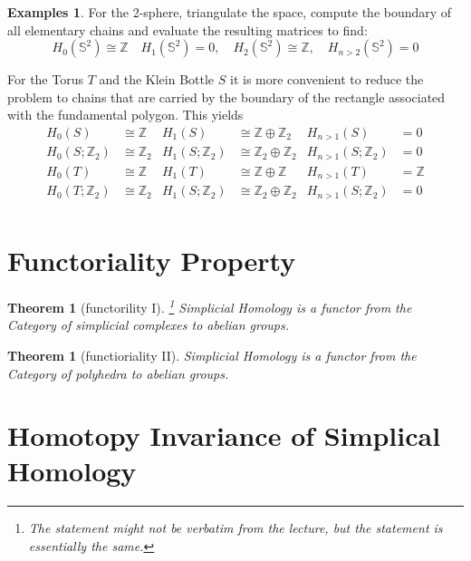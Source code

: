 \documentclass[a4paper,DIV10,10pt]{scrartcl}
\newcommand{\Z}{\ensuremath{\mathbb{Z}}}   %
\newtheorem{theorem}[satz]{Theorem}
\theoremstyle{definition}
\newtheorem{examples}[satz]{Examples}
\begin{document}
\begin{examples}
	For the 2-sphere, triangulate the space, compute the boundary of all elementary chains and evaluate the resulting matrices to find:
	\[H_0(\mathbb{S}^2)\cong\Z\quad H_1(\mathbb{S}^2)=0,\quad H_2(\mathbb{S}^2)\cong \Z, \quad H_{n>2}(\mathbb{S}^2)=0\]
	
	For the Torus $T$ and the Klein Bottle $S$ it is more convenient to reduce the problem to chains that are carried by the boundary of the rectangle associated with the fundamental polygon. This yields
	\begin{align*}
	H_0(S)&\cong\Z&H_1(S)&\cong\Z\oplus\Z_2&H_{n>1}(S)&=0\\
	H_0(S;\Z_2)&\cong\Z_2&H_1(S;\Z_2)&\cong\Z_2\oplus\Z_2&H_{n>1}(S;\Z_2)&=0\\
	H_0(T)&\cong\Z&H_1(T)&\cong\Z\oplus\Z&H_{n>1}(T)&=\Z\\
	H_0(T;\Z_2)&\cong\Z_2&H_1(S;\Z_2)&\cong\Z_2\oplus\Z_2&H_{n>1}(S;\Z_2)&=0\\
	\end{align*}
\end{examples}
\section{Functoriality Property}
\begin{theorem}[functorility I]\footnote{The statement might not be verbatim from the lecture, but the statement is essentially the same.}
	Simplicial Homology is a functor from the Category of simplicial complexes to abelian groups.
\end{theorem}

\begin{theorem}[functioriality II]
	Simplicial Homology is a functor from the Category of polyhedra to abelian groups.
\end{theorem}

\section{Homotopy Invariance of Simplical Homology}
\end{document}
